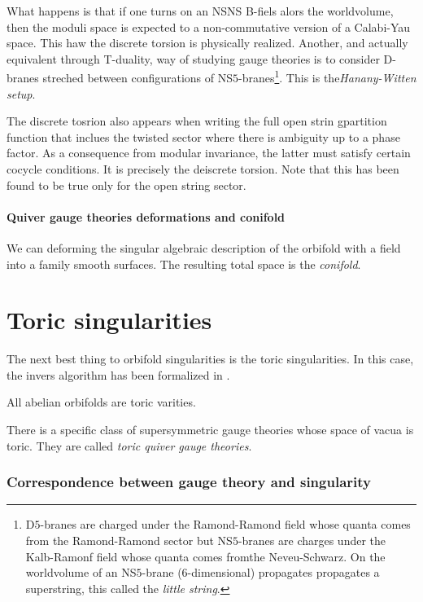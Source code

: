         What happens is that if one turns on an NSNS B-fiels alors the worldvolume, then the moduli space is expected to a non-commutative version of a Calabi-Yau space. This haw the discrete torsion is physically realized. Another, and actually equivalent through T-duality, way of studying gauge theories is to consider D-branes streched between configurations of NS$5$-branes\footnote{D$5$-branes are charged under the Ramond-Ramond field whose quanta comes from the Ramond-Ramond sector but NS$5$-branes are charges under the Kalb-Ramonf field whose quanta comes fromthe Neveu-Schwarz. On the worldvolume of an NS$5$-brane (6-dimensional) propagates propagates a superstring, this called the \emph{little string}.}. This is the\emph{Hanany-Witten setup}.

        The discrete tosrion also appears when writing the full open strin gpartition function that inclues the twisted sector where there is ambiguity up to a phase factor. As a consequence from modular invariance, the latter must satisfy certain cocycle conditions. It is precisely the deiscrete torsion. Note that this has been found to be true only for the open string sector.

    \subsection{Quiver gauge theories deformations and conifold}

        We can deforming the singular algebraic description of the orbifold with a field into a family smooth surfaces. The resulting total space is the \emph{conifold}.

\part{Toric singularities}

    The next best thing to orbifold singularities is the toric singularities. In this case, the invers algorithm has been formalized in \cite{Feng_2001}.

    All abelian orbifolds are toric varities.

    There is a specific class of supersymmetric gauge theories whose space of vacua is toric. They are called \emph{toric quiver gauge theories}.

\section{Correspondence between gauge theory and singularity}

